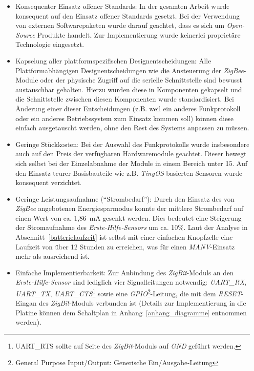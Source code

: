 \begin{itemize}
    \item{Konsequenter Einsatz offener Standards:} In der gesamten Arbeit wurde konsequent auf den
          Einsatz offener Standards gesetzt. Bei der Verwendung von externen Softwarepaketen wurde
          darauf geachtet, dass es sich um \emph{Open-Source} Produkte handelt. Zur Implementierung
          wurde keinerlei proprietäre Technologie eingesetzt.

    \item{Kapselung aller plattformspezifischen Designentscheidungen:} Alle Plattformabhängigen
          Designentscheidungen wie die Ansteuerung der \emph{ZigBee}-Module oder der
          physische Zugriff auf die serielle Schnittstelle sind bewusst austauschbar gehalten.
          Hierzu wurden diese in Komponenten gekapselt und die Schnittstelle zwischen diesen
          Komponenten wurde standardisiert. Bei Änderung einer dieser Entscheidungen (z.B.
          weil ein anderes Funkprotokoll oder ein anderes Betriebssystem zum Einsatz kommen soll)
          können diese einfach ausgetauscht werden, ohne den Rest des Systems anpassen zu 
          müssen.

    \item{Geringe Stückkosten:} Bei der Auswahl des Funkprotokolls wurde insbesondere auch auf den
          Preis der verfügbaren Hardwaremodule geachtet. Dieser bewegt sich selbst bei der
          Einzelabnahme der Module in einem Bereich unter 15\EUR{}. Auf den Einsatz teurer
          Basisbauteile wie z.B. \emph{TinyOS}-basierten Sensoren wurde konsequent verzichtet.

    \item{Geringe Leistungsaufnahme ("`Strombedarf"'):} Durch den Einsatz des von \emph{ZigBee}
          angebotenen Energiesparmodus konnte der mittlere Strombedarf auf einen Wert von ca. 
          1,86~mA gesenkt werden. Dies bedeutet eine Steigerung der Stromaufnahme des 
          \emph{Erste-Hilfe-Sensors} um ca. 10\%. 
          Laut der Analyse in Abschnitt~\ref{batterielaufzeit} ist selbst mit einer einfachen Knopfzelle
          eine Laufzeit von über 12 Stunden zu erreichen, was für einen \emph{MANV}-Einsatz mehr als
          ausreichend ist.

    \item{Einfache Implementierbarkeit:} Zur Anbindung des \emph{ZigBit}-Moduls an den \emph{Erste-Hilfe-Sensor}
          sind lediglich vier Signalleitungen notwendig: \emph{UART\_RX}, \emph{UART\_TX}, 
          \emph{UART\_CTS}\footnote{UART\_RTS sollte auf Seite des \emph{ZigBit}-Moduls auf \emph{GND}
              geführt werden.} sowie eine \emph{GPIO}\footnote{General Purpose Input/Output: 
              Generische Ein/Ausgabe-Leitung}-Leitung, 
              die mit dem \emph{RESET}-Eingan des
          \emph{ZigBit}-Moduls verbunden ist (Details zur Implementierung in die Platine können dem
          Schaltplan in Anhang~\ref{anhang_diagramme} entnommen werden). 


\end{itemize}
